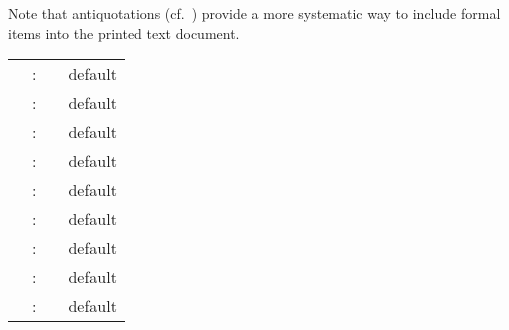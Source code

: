 \begin{isabellebody}
\begin{isamarkuptext}
  Note that antiquotations (cf.\ ) provide a more
  systematic way to include formal items into the printed text
  document.%
\end{isamarkuptext}%
\isamarkuptrue%
%
\isamarkuptrue%
%
\begin{isamarkuptext}%
\begin{tabular}{rcll}
    \indexdef{}{attribute}{show\_types}\hypertarget{attribute.show-types}{\hyperlink{attribute.show-types}{\mbox{\isa{show{\isaliteral{5F}{\isacharunderscore}}types}}}} & : & \isa{attribute} & default \isa{false} \\
    \indexdef{}{attribute}{show\_sorts}\hypertarget{attribute.show-sorts}{\hyperlink{attribute.show-sorts}{\mbox{\isa{show{\isaliteral{5F}{\isacharunderscore}}sorts}}}} & : & \isa{attribute} & default \isa{false} \\
    \indexdef{}{attribute}{show\_consts}\hypertarget{attribute.show-consts}{\hyperlink{attribute.show-consts}{\mbox{\isa{show{\isaliteral{5F}{\isacharunderscore}}consts}}}} & : & \isa{attribute} & default \isa{false} \\
    \indexdef{}{attribute}{show\_abbrevs}\hypertarget{attribute.show-abbrevs}{\hyperlink{attribute.show-abbrevs}{\mbox{\isa{show{\isaliteral{5F}{\isacharunderscore}}abbrevs}}}} & : & \isa{attribute} & default \isa{true} \\
    \indexdef{}{attribute}{show\_brackets}\hypertarget{attribute.show-brackets}{\hyperlink{attribute.show-brackets}{\mbox{\isa{show{\isaliteral{5F}{\isacharunderscore}}brackets}}}} & : & \isa{attribute} & default \isa{false} \\
    \indexdef{}{attribute}{names\_long}\hypertarget{attribute.names-long}{\hyperlink{attribute.names-long}{\mbox{\isa{names{\isaliteral{5F}{\isacharunderscore}}long}}}} & : & \isa{attribute} & default \isa{false} \\
    \indexdef{}{attribute}{names\_short}\hypertarget{attribute.names-short}{\hyperlink{attribute.names-short}{\mbox{\isa{names{\isaliteral{5F}{\isacharunderscore}}short}}}} & : & \isa{attribute} & default \isa{false} \\
    \indexdef{}{attribute}{names\_unique}\hypertarget{attribute.names-unique}{\hyperlink{attribute.names-unique}{\mbox{\isa{names{\isaliteral{5F}{\isacharunderscore}}unique}}}} & : & \isa{attribute} & default \isa{true} \\
    \indexdef{}{attribute}{eta\_contract}\hypertarget{attribute.eta-contract}{\hyperlink{attribute.eta-contract}{\mbox{\isa{eta{\isaliteral{5F}{\isacharunderscore}}contract}}}} & : & \isa{attribute} & default \isa{true} \\

\end{tabular}
\end{isamarkuptext}
\end{isabellebody}
